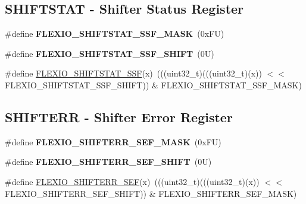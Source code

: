 \subsection*{S\+H\+I\+F\+T\+S\+T\+AT -\/ Shifter Status Register}
\begin{DoxyCompactItemize}
\item 
\mbox{\label{group___f_l_e_x_i_o___register___masks_ga27fdf9e48de40245a9ca750ddd754d91}} 
\#define {\bfseries F\+L\+E\+X\+I\+O\+\_\+\+S\+H\+I\+F\+T\+S\+T\+A\+T\+\_\+\+S\+S\+F\+\_\+\+M\+A\+SK}~(0x\+F\+U)
\item 
\mbox{\label{group___f_l_e_x_i_o___register___masks_ga40924ebd11ecf619fa25dd2d3909dbc1}} 
\#define {\bfseries F\+L\+E\+X\+I\+O\+\_\+\+S\+H\+I\+F\+T\+S\+T\+A\+T\+\_\+\+S\+S\+F\+\_\+\+S\+H\+I\+FT}~(0\+U)
\item 
\#define \mbox{\hyperlink{group___f_l_e_x_i_o___register___masks_ga280d163e6545bc882393d1f2762910b6}{F\+L\+E\+X\+I\+O\+\_\+\+S\+H\+I\+F\+T\+S\+T\+A\+T\+\_\+\+S\+SF}}(x)~(((uint32\+\_\+t)(((uint32\+\_\+t)(x)) $<$$<$ F\+L\+E\+X\+I\+O\+\_\+\+S\+H\+I\+F\+T\+S\+T\+A\+T\+\_\+\+S\+S\+F\+\_\+\+S\+H\+I\+FT)) \& F\+L\+E\+X\+I\+O\+\_\+\+S\+H\+I\+F\+T\+S\+T\+A\+T\+\_\+\+S\+S\+F\+\_\+\+M\+A\+SK)
\end{DoxyCompactItemize}
\subsection*{S\+H\+I\+F\+T\+E\+RR -\/ Shifter Error Register}
\begin{DoxyCompactItemize}
\item 
\mbox{\label{group___f_l_e_x_i_o___register___masks_ga4a4af5e78cba1d9ce00baee9bf1735f6}} 
\#define {\bfseries F\+L\+E\+X\+I\+O\+\_\+\+S\+H\+I\+F\+T\+E\+R\+R\+\_\+\+S\+E\+F\+\_\+\+M\+A\+SK}~(0x\+F\+U)
\item 
\mbox{\label{group___f_l_e_x_i_o___register___masks_ga83b42d64ab48800e66587fd4f8eef7c4}} 
\#define {\bfseries F\+L\+E\+X\+I\+O\+\_\+\+S\+H\+I\+F\+T\+E\+R\+R\+\_\+\+S\+E\+F\+\_\+\+S\+H\+I\+FT}~(0\+U)
\item 
\#define \mbox{\hyperlink{group___f_l_e_x_i_o___register___masks_ga770e512bf422f288116f5f0b33ee8e30}{F\+L\+E\+X\+I\+O\+\_\+\+S\+H\+I\+F\+T\+E\+R\+R\+\_\+\+S\+EF}}(x)~(((uint32\+\_\+t)(((uint32\+\_\+t)(x)) $<$$<$ F\+L\+E\+X\+I\+O\+\_\+\+S\+H\+I\+F\+T\+E\+R\+R\+\_\+\+S\+E\+F\+\_\+\+S\+H\+I\+FT)) \& F\+L\+E\+X\+I\+O\+\_\+\+S\+H\+I\+F\+T\+E\+R\+R\+\_\+\+S\+E\+F\+\_\+\+M\+A\+SK)
\end{DoxyCompactItemize}
